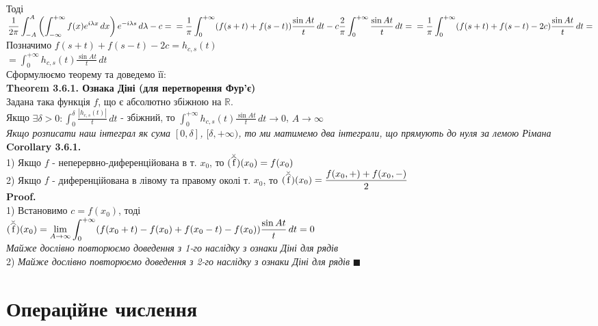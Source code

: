 \documentclass[a4paper, 14pt]{extarticle}
\newcommand\reallywidehat[1]{%
\savestack{\tmpbox}{\stretchto{%
  \scaleto{%
    \scalerel*[\widthof{\ensuremath{#1}}]{\kern-.6pt\bigwedge\kern-.6pt}%
    {\rule[-\textheight/2]{1ex}{\textheight}}%
  }{\textheight}%
}{0.5ex}}%
\stackon[1pt]{#1}{\tmpbox}%
}
\def\hugespace{\vspace{5mm} \\}
\begin{document}
\\
Тоді\\
$\displaystyle \frac{1}{2\pi} \displaystyle \int_{-A}^{A} \left(\int_{-\infty}^{+\infty} f(x) e^{i\lambda x}\,dx \right) e^{-i \lambda s}\,d\lambda - c = \\ 
= \frac{1}{\pi} \int_{0}^{+\infty} (f(s+t)+f(s-t)) \frac{ \sin At}{t} \,dt - c \frac{2}{\pi} \int_0^{+\infty} \frac{\sin At}{t}\,dt = \\ 
= \frac{1}{\pi} \int_{0}^{+\infty} (f(s+t)+f(s-t)-2c) \frac{\sin At}{t}\,dt =$\\
Позначимо $f(s+t)+f(s-t)-2c=h_{c,s}(t)$\\
$= \displaystyle \int_{0}^{+\infty} h_{c,s}(t) \frac{\sin At}{t}\,dt$\\
Сформулюємо теорему та доведемо її:
\hugespace
\textbf{Theorem 3.6.1. Ознака Діні (для перетворення Фур'є)}\\
Задана така функція $f$, що є абсолютно збіжною на $\mathbb{R}$.\\
Якщо $\exists \delta>0: \displaystyle \int_{0}^{\delta} \frac{|h_{c,s}(t)|}{t}\,dt$ - збіжний, то $\displaystyle \int_{0}^{+\infty} h_{c,s}(t) \frac{\sin At}{t}\,dt \to 0$, $A \to \infty$\\
\textit{Якщо розписати наш інтеграл як сума $[0,\delta]$, $[\delta, +\infty)$, то ми матимемо два інтеграли, що прямують до нуля за лемою Рімана}
\hugespace
\textbf{Corollary 3.6.1.}\\
1) Якщо $f$ - неперервно-диференційована в т. $x_0$, то $\breve{(\reallywidehat{f})}(x_0) = f(x_0)$
\hugespace
2) Якщо $f$ - диференційована в лівому та правому околі т. $x_0$, то $\displaystyle \breve{(\reallywidehat{f})}(x_0) = \frac{f(x_0,+)+f(x_0,-)}{2}$\\
\textbf{Proof.}\\
1) Встановимо $c = f(x_0)$, тоді\\
$\displaystyle \breve{(\reallywidehat{f})}(x_0) = \lim_{A \to \infty} \int_{0}^{+\infty} (f(x_0+t)-f(x_0)+f(x_0-t)-f(x_0)) \frac{\sin At}{t}\,dt = 0$\\
\textit{Майже дослівно повторюємо доведення з 1-го наслідку з ознаки Діні для рядів}
\hugespace
2) \textit{Майже дослівно повторюємо доведення з 2-го наслідку з ознаки Діні для рядів} $\blacksquare$
\\
\newpage




\section{Операційне числення}
\end{document}
